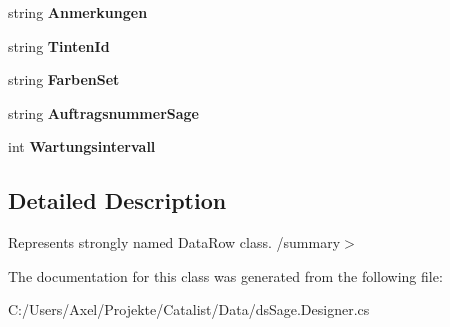 \begin{DoxyCompactItemize}
\item 
string {\bfseries Anmerkungen}\hypertarget{class_products_1_1_data_1_1ds_sage_1_1_kundenmaschine_row_af29ba1ab009026e0faebab2d69c90fca}{}\label{class_products_1_1_data_1_1ds_sage_1_1_kundenmaschine_row_af29ba1ab009026e0faebab2d69c90fca}

\item 
string {\bfseries Tinten\+Id}\hypertarget{class_products_1_1_data_1_1ds_sage_1_1_kundenmaschine_row_ae972477fde701e8ad544b357ce5e74f5}{}\label{class_products_1_1_data_1_1ds_sage_1_1_kundenmaschine_row_ae972477fde701e8ad544b357ce5e74f5}

\item 
string {\bfseries Farben\+Set}\hypertarget{class_products_1_1_data_1_1ds_sage_1_1_kundenmaschine_row_a685e84c6e76738c5724dc796d02f135a}{}\label{class_products_1_1_data_1_1ds_sage_1_1_kundenmaschine_row_a685e84c6e76738c5724dc796d02f135a}

\item 
string {\bfseries Auftragsnummer\+Sage}\hypertarget{class_products_1_1_data_1_1ds_sage_1_1_kundenmaschine_row_ac8e0d15eed488841e8c5b8a0042b7910}{}\label{class_products_1_1_data_1_1ds_sage_1_1_kundenmaschine_row_ac8e0d15eed488841e8c5b8a0042b7910}

\item 
int {\bfseries Wartungsintervall}\hypertarget{class_products_1_1_data_1_1ds_sage_1_1_kundenmaschine_row_aad195b948bffde43b08122a8a0919e94}{}\label{class_products_1_1_data_1_1ds_sage_1_1_kundenmaschine_row_aad195b948bffde43b08122a8a0919e94}

\end{DoxyCompactItemize}


\subsection{Detailed Description}
Represents strongly named Data\+Row class. /summary$>$ 

The documentation for this class was generated from the following file\+:\begin{DoxyCompactItemize}
\item 
C\+:/\+Users/\+Axel/\+Projekte/\+Catalist/\+Data/ds\+Sage.\+Designer.\+cs\end{DoxyCompactItemize}
